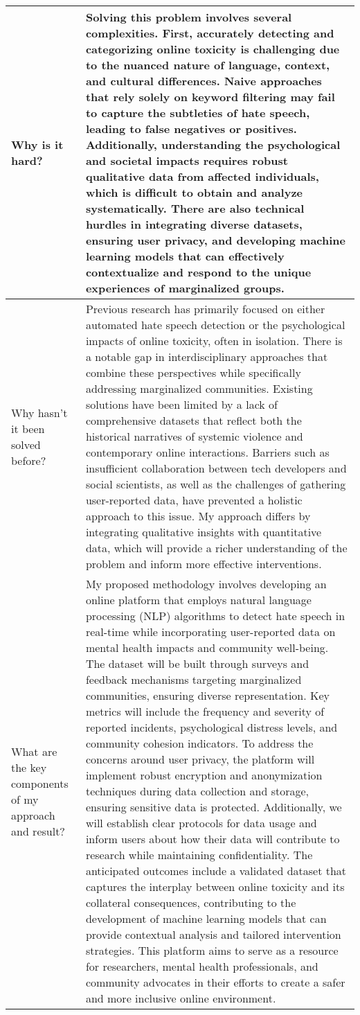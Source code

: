 \begin{table*}[htbp]
\begin{tabular}{p{3.5cm}p{12cm}}
Why is it hard? & 
Solving this problem involves several complexities. First, accurately detecting and categorizing online toxicity is challenging due to the nuanced nature of language, context, and cultural differences. Naive approaches that rely solely on keyword filtering may fail to capture the subtleties of hate speech, leading to false negatives or positives. Additionally, understanding the psychological and societal impacts requires robust qualitative data from affected individuals, which is difficult to obtain and analyze systematically. There are also technical hurdles in integrating diverse datasets, ensuring user privacy, and developing machine learning models that can effectively contextualize and respond to the unique experiences of marginalized groups.\\ \midrule
Why hasn't it been solved before? & 
Previous research has primarily focused on either automated hate speech detection or the psychological impacts of online toxicity, often in isolation. There is a notable gap in interdisciplinary approaches that combine these perspectives while specifically addressing marginalized communities. Existing solutions have been limited by a lack of comprehensive datasets that reflect both the historical narratives of systemic violence and contemporary online interactions. Barriers such as insufficient collaboration between tech developers and social scientists, as well as the challenges of gathering user-reported data, have prevented a holistic approach to this issue. My approach differs by integrating qualitative insights with quantitative data, which will provide a richer understanding of the problem and inform more effective interventions.\\ \midrule
What are the key components of my approach and result? & 
My proposed methodology involves developing an online platform that employs natural language processing (NLP) algorithms to detect hate speech in real-time while incorporating user-reported data on mental health impacts and community well-being. The dataset will be built through surveys and feedback mechanisms targeting marginalized communities, ensuring diverse representation. Key metrics will include the frequency and severity of reported incidents, psychological distress levels, and community cohesion indicators. To address the concerns around user privacy, the platform will implement robust encryption and anonymization techniques during data collection and storage, ensuring sensitive data is protected. Additionally, we will establish clear protocols for data usage and inform users about how their data will contribute to research while maintaining confidentiality. The anticipated outcomes include a validated dataset that captures the interplay between online toxicity and its collateral consequences, contributing to the development of machine learning models that can provide contextual analysis and tailored intervention strategies. This platform aims to serve as a resource for researchers, mental health professionals, and community advocates in their efforts to create a safer and more inclusive online environment.\\ 

\end{tabular}
\end{table*}
